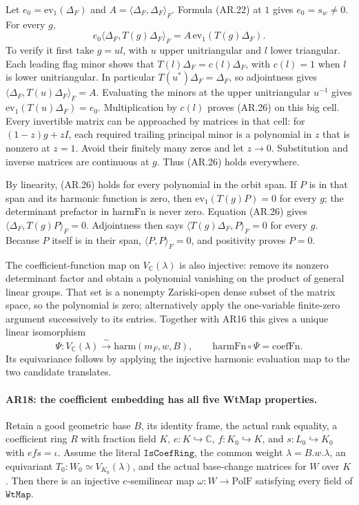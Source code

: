 Let $e_0=\mathrm{ev}_1(\Delta_F)$ and
$A=\langle\Delta_F,\Delta_F\rangle_F$.
Formula (AR.22) at $1$ gives $e_0=s_w\ne0$.
For every $g$,
\[
 e_0\langle\Delta_F,T(g)\Delta_F\rangle_F
                         =A\,\mathrm{ev}_1(T(g)\Delta_F).       \tag{AR.26}
\]
To verify it first take $g=ul$, with $u$ upper unitriangular
and $l$ lower triangular. Each leading flag minor shows that
$T(l)\Delta_F=c(l)\Delta_F$, with $c(l)=1$ when $l$ is lower
unitriangular. In particular $T(u^*)\Delta_F=\Delta_F$, so
adjointness gives
$\langle\Delta_F,T(u)\Delta_F\rangle_F=A$.
Evaluating the minors at the upper unitriangular $u^{-1}$ gives
$\mathrm{ev}_1(T(u)\Delta_F)=e_0$.
Multiplication by $c(l)$ proves (AR.26) on this big cell.
Every invertible matrix can be approached by matrices in that cell:
for $(1-z)g+zI$, each required trailing principal minor is a
polynomial in $z$ that is nonzero at $z=1$. Avoid their finitely many
zeros and let $z\to0$. Substitution and inverse matrices are
continuous at $g$. Thus (AR.26) holds everywhere.

By linearity, (AR.26) holds for every polynomial in the orbit span.
If $P$ is in that span and its harmonic function is zero, then
$\mathrm{ev}_1(T(g)P)=0$ for every $g$; the determinant prefactor
in $\mathrm{harmFn}$ is never zero. Equation (AR.26) gives
$\langle\Delta_F,T(g)P\rangle_F=0$.
Adjointness then says
$\langle T(g)\Delta_F,P\rangle_F=0$ for every $g$.
Because $P$ itself is in their span, $\langle P,P\rangle_F=0$,
and positivity proves $P=0$.

The coefficient-function map on $V_{\mathbb C}(\lambda)$ is also
injective: remove its nonzero determinant factor and obtain a
polynomial vanishing on the product of general linear groups.
That set is a nonempty Zariski-open dense subset of the matrix
space, so the polynomial is zero; alternatively apply the
one-variable finite-zero argument successively to its entries.
Together with AR16 this gives a unique linear isomorphism
\[
 \Psi:V_{\mathbb C}(\lambda)\xrightarrow{\ \sim\ }
                      \mathrm{harm}(m_F,w,B),
 \qquad \mathrm{harmFn}\circ\Psi=\mathrm{coefFn}.        \tag{AR.27}
\]
Its equivariance follows by applying the injective harmonic
evaluation map to the two candidate translates.

\paragraph{AR18: the coefficient embedding has all five WtMap properties.}
Retain a good geometric base $B$, its identity frame, the actual
rank equality, a coefficient ring $R$ with fraction field $K$,
$e:K\hookrightarrow\mathbb C$, $f:K_0\hookrightarrow K$, and
$s:L_0\hookrightarrow K_0$ with $efs=\iota$.
Assume the literal $\texttt{IsCoefRing}$, the common weight
$\lambda=B.w.\lambda$, an equivariant
$T_0:W_0\simeq V_{K_0}(\lambda)$, and the actual base-change
matrices for $W$ over $K$. Then there is an injective
$e$-semilinear map $\omega:W\to\mathrm{PolF}$ satisfying every
field of $\texttt{WtMap}$.

